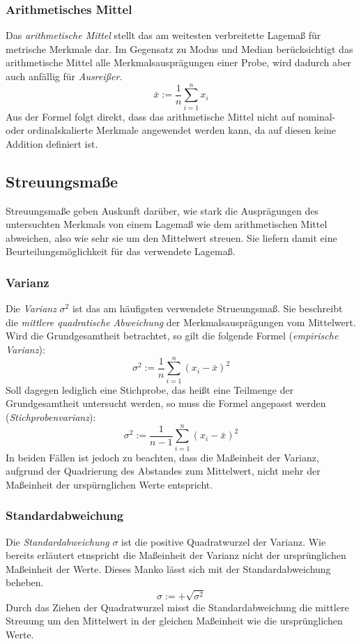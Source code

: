 \documentclass[a4paper]{scrartcl}
\begin{document}
\begin{multicols}{2}
                    \subsubsection{Arithmetisches Mittel}
                        Das \emph{arithmetische Mittel} stellt das am weitesten verbreitette Lagemaß für metrische Merkmale dar. Im Gegensatz zu Modus und Median berücksichtigt das arithmetische Mittel alle Merkmalsausprägungen einer Probe, wird dadurch aber auch anfällig für \emph{Ausreißer}.
                        $$ \bar{x} := \frac{1}{n}\sum_{i=1}^nx_i $$ 
                        Aus der Formel folgt direkt, dass das arithmetische Mittel nicht auf nominal- oder ordinalskalierte Merkmale angewendet werden kann, da auf diesen keine Addition definiert ist.

                \subsection{Streuungsmaße}
                    Streuungsmaße geben Auskunft darüber, wie stark die Ausprägungen des untersuchten Merkmals von einem Lagemaß wie dem arithmetischen Mittel abweichen, also wie sehr sie um den Mittelwert streuen. Sie liefern damit eine Beurteilungsmöglichkeit für das verwendete Lagemaß.
                    \subsubsection{Varianz}
                        Die \emph{Varianz} $\sigma^2$ ist das am häufigsten verwendete Strueungsmaß. Sie beschreibt die \emph{mittlere quadratische Abweichung} der Merkmalsausprägungen vom Mittelwert.
                        Wird die Grundgesamtheit betrachtet, so gilt die folgende Formel (\emph{empirische Varianz}): 
                        $$ \sigma^2 := \frac{1}{n}\sum_{i=1}^n(x_i - \bar{x})^2 $$
                        Soll dagegen lediglich eine Stichprobe, das heißt eine Teilmenge der Grundgesamtheit untersucht werden, so muss die Formel angepasst werden (\emph{Stichprobenvarianz}):
                        $$ \sigma^2 := \frac{1}{n-1}\sum_{i=1}^n(x_i - \bar{x})^2  $$
                        In beiden Fällen ist jedoch zu beachten, dass die Maßeinheit der Varianz, aufgrund der Quadrierung des Abstandes zum Mittelwert, nicht mehr der Maßeinheit der urspürnglichen Werte entspricht.
                    \subsubsection{Standardabweichung}
                        Die \emph{Standardabweichung} $\sigma$ ist die positive Quadratwurzel der Varianz. Wie bereits erläutert etnspricht die Maßeinheit der Varianz nicht der ursprünglichen Maßeinheit der Werte. Dieses Manko lässt sich mit der Standardabweichung beheben.
                        $$ \sigma := + \sqrt{\sigma^2} $$
                        Durch das Ziehen der Quadratwurzel misst die Standardabweichung die mittlere Streuung um den Mittelwert in der gleichen Maßeinheit wie die ursprünglichen Werte.


\end{multicols}
\end{document}
